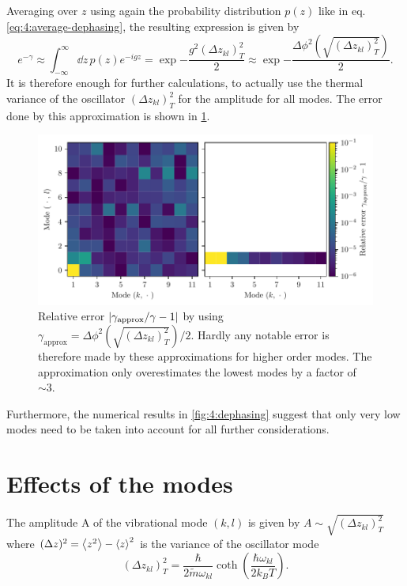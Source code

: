 Averaging over $z$ using again the probability distribution $p(z)$ like in eq. \eqref{eq:4:average-dephasing}, the resulting expression is given by
\begin{equation}
  e^{-\gamma} \approx \int_{-\infty}^{\infty} \dd z \, p(z) e^{-i g z} = \exp{-\frac{g^2 (\Delta z_{kl})^2_T}{2}} \approx \exp{-\frac{\Delta\phi^2\left(\sqrt{(\Delta z_{kl})^2_T}\right)}{2}} .
\end{equation}
It is therefore enough for further calculations, to actually use the thermal variance of the oscillator $(\Delta z_{kl})^2_T$ for the amplitude for all modes. The error done by this approximation is shown in \cref{fig:4:dephasing-approximation-error}.
\begin{figure}[!htbp]
  \centering
  \includegraphics[width=\textwidth]{./../figures/vibrations/vibrational-dephasing-approximation-error.pdf}
  \caption{Relative error $\left\lvert\gamma_\mathrm{approx} / \gamma - 1\right\rvert$ by using $\gamma_\mathrm{approx} = \Delta\phi^2\left(\sqrt{(\Delta z_{kl})^2_T}\right)/2$. Hardly any notable error is therefore made by these approximations for higher order modes. The approximation only overestimates the lowest modes by a factor of $\sim 3$.}
  \label{fig:4:dephasing-approximation-error}
\end{figure}
Furthermore, the numerical results in \cref{fig:4:dephasing} suggest that only very low modes need to be taken into account for all further considerations.


\section{Effects of the modes}


The amplitude A of the vibrational mode $(k,l)$ is given by $A \sim \sqrt{(\Delta z_{kl})^2_T}$ where $(\Delta z)^2 = \left\langle z^2\right\rangle - \left\langle z\right\rangle^2$ is the variance of the oscillator mode
\begin{equation}
  (\Delta z_{kl})^2_T = \frac{\hbar}{2\tilde{m}\omega_{kl}} \coth(\frac{\hbar \omega_{kl}}{2 k_B T}) .
\end{equation}

